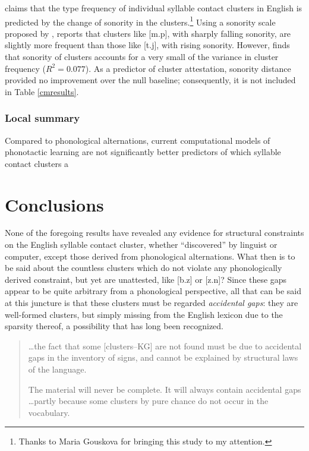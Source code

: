 \subsubsection{\citealt{McGowan2009}}

\citet{McGowan2009} claims that the type frequency of individual syllable contact clusters in English is predicted by the change of sonority in the clusters.\footnote{Thanks to Maria Gouskova for bringing this study to my attention.} Using a sonority scale proposed by \citet{Jespersen1904}, \citeauthor{McGowan2009} reports that clusters like [m.p], with sharply falling sonority, are slightly more frequent than those like [t.j], with rising sonority. However, \citeauthor{McGowan2009} finds that sonority of clusters accounts for a very small of the variance in cluster frequency ($R^2 = 0.077$). As a predictor of cluster attestation, sonority distance provided no improvement over the null baseline; consequently, it is not included in Table \ref{cmresults}.

\subsubsection{Local summary}

Compared to phonological alternations, current computational models of phonotactic learning are not significantly better predictors of which syllable contact clusters a

\section{Conclusions}

None of the foregoing results have revealed any evidence for structural constraints on the English syllable contact cluster, whether ``discovered'' by linguist or computer, except those derived from phonological alternations. What then is to be said about the countless clusters which do not violate any phonologically derived constraint, but yet are unattested, like [b.z] or [z.n]? Since these gaps appear to be quite arbitrary from a phonological perspective, all that can be said at this juncture is that these clusters must be regarded \emph{accidental gaps}: they are well-formed clusters, but simply missing from the English lexicon due to the sparsity thereof, a possibility that has long been recognized.

\begin{quote}
\ldots{}the fact that some [clusters--KG] are not found must be due to accidental gaps in the inventory of signs, and cannot be explained by structural laws of the language. \citep[][16]{Fischer-Jorgensen1952}

The material will never be complete. It will always contain accidental gaps \ldots partly because some clusters by pure chance do not occur in the vocabulary. \citep[][30]{Vogt1954}
\end{quote}

